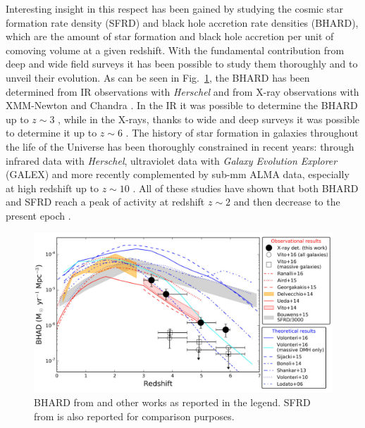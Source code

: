 Interesting insight in this respect has been gained by studying the cosmic star formation rate density (SFRD) and black hole accretion rate densities (BHARD), which are the amount of star formation and black hole accretion per unit of comoving volume at a given redshift. With the fundamental contribution from deep and wide field surveys it has been possible to study them thoroughly and to unveil their evolution.
As can be seen in Fig.~\ref{fig:BHARD}, the BHARD has been determined from IR observations with \emph{Herschel} \citep{2010A&A...518L...1P} and from X-ray observations with XMM-Newton \citep{2001A&A...365L...1J} and Chandra \citep{2000SPIE.4012....2W}. In the IR it was possible to determine the BHARD up to $z\sim3$ \citep{2014MNRAS.439.2736D}, while in the X-rays, thanks to wide and deep surveys it was possible to determine it up to $z\sim 6$ \citep{2018MNRAS.473.2378V}.
The history of star formation in galaxies throughout the life of the Universe has been thoroughly constrained in recent years: %
through infrared data with \emph{Herschel}, ultraviolet data with \emph{Galaxy Evolution Explorer} (GALEX) \citep[see][for a review]{2014ARA&A..52..415M} and more recently complemented by sub-mm ALMA data, especially at high redshift up to $z\sim10$ \citep{2020ApJ...902..112B,2020A&A...643A...8G}. %
All of these studies have shown that both BHARD and SFRD reach a peak of activity at redshift $z\sim2$ and then decrease to the present epoch \citep{1998MNRAS.293L..49B}.

\begin{figure}
\begin{center}
  \includegraphics[width=\textwidth]{Figs/Intro/BHARD_Vito18.pdf}
  \vspace{-30pt}
  \caption{BHARD from \citet{2018MNRAS.473.2378V} and other works as reported in the legend. SFRD from \citet{2015ApJ...803...34B} is also reported for comparison purposes.}
    \label{fig:BHARD}
\end{center}
\end{figure}

